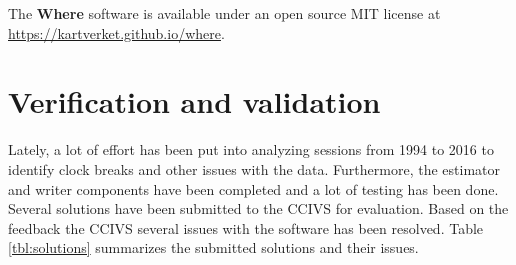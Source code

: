 \documentclass[twocolumn,twoside]{svmultivs_gm} %
\begin{document}
The \textbf{Where} software is available under an open source MIT license at \url{https://kartverket.github.io/where}.

\section{Verification and validation}

Lately, a lot of effort has been put into analyzing sessions from 1994 to 2016 to identify clock breaks and other issues
with the data. Furthermore, the estimator and writer components have been completed and a lot of testing has been done.
Several solutions have been submitted to the CCIVS for evaluation. Based on the feedback the
CCIVS several issues with the software has been resolved. Table \ref{tbl:solutions} summarizes the 
submitted solutions and their issues.
\end{document}
